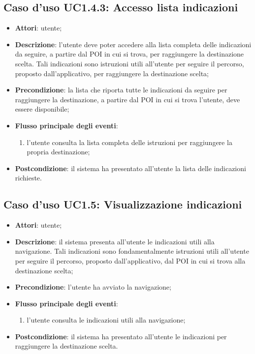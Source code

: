 \documentclass[../AnalisiDeiRequisiti.tex]{subfiles}
\begin{document}
\subsection{Caso d'uso UC1.4.3: Accesso lista indicazioni}
\begin{itemize}
\item \textbf{Attori}: utente;
\item \textbf{Descrizione}: l'utente deve poter accedere alla lista completa delle indicazioni da seguire, a partire dal POI in cui si trova, per raggiungere la destinazione scelta. Tali indicazioni sono istruzioni utili all'utente per seguire il percorso, proposto dall'applicativo, per raggiungere la destinazione scelta; 
      \item \textbf{Precondizione}: la lista che riporta tutte le indicazioni da seguire per raggiungere la destinazione, a partire dal POI in cui si trova l'utente, deve essere disponibile;

        \item \textbf{Flusso principale degli eventi}:
          \begin{enumerate}
          \item l'utente consulta la lista completa delle istruzioni per raggiungere la propria destinazione;

      \end{enumerate}
    \item \textbf{Postcondizione}: il sistema ha presentato all'utente la lista delle indicazioni richieste.
  \end{itemize}
\hypertarget{UC1.5}{}
\subsection{Caso d'uso UC1.5: Visualizzazione indicazioni}

\begin{itemize}
\item \textbf{Attori}: utente;
\item \textbf{Descrizione}: il sistema presenta all'utente le indicazioni utili alla navigazione. Tali indicazioni sono fondamentalmente istruzioni utili all'utente per seguire il percorso, proposto dall'applicativo, dal POI in cui si trova alla destinazione scelta; 
      \item \textbf{Precondizione}: l'utente ha avviato la navigazione;

        \item \textbf{Flusso principale degli eventi}:
          \begin{enumerate}
          \item l'utente consulta le indicazioni utili alla navigazione;

      \end{enumerate}

    \item \textbf{Postcondizione}: il sistema ha presentato all'utente le indicazioni per raggiungere la destinazione scelta.
  \end{itemize}
\hypertarget{UC1.6}{}
\end{document}
